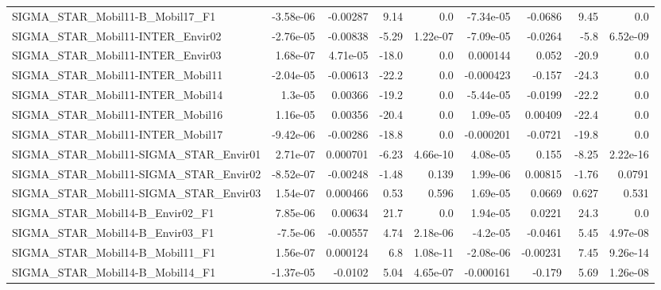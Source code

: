 \begin{tabular}{lrrrrrrrr}
SIGMA\_STAR\_Mobil11-B\_Mobil17\_F1           &   -3.58e-06 &     -0.00287 &    9.14 &      0.0 &  -7.34e-05 &     -0.0686 &         9.45 &           0.0 \\
SIGMA\_STAR\_Mobil11-INTER\_Envir02          &   -2.76e-05 &     -0.00838 &   -5.29 & 1.22e-07 &  -7.09e-05 &     -0.0264 &         -5.8 &      6.52e-09 \\
SIGMA\_STAR\_Mobil11-INTER\_Envir03          &    1.68e-07 &     4.71e-05 &   -18.0 &      0.0 &   0.000144 &       0.052 &        -20.9 &           0.0 \\
SIGMA\_STAR\_Mobil11-INTER\_Mobil11          &   -2.04e-05 &     -0.00613 &   -22.2 &      0.0 &  -0.000423 &      -0.157 &        -24.3 &           0.0 \\
SIGMA\_STAR\_Mobil11-INTER\_Mobil14          &     1.3e-05 &      0.00366 &   -19.2 &      0.0 &  -5.44e-05 &     -0.0199 &        -22.2 &           0.0 \\
SIGMA\_STAR\_Mobil11-INTER\_Mobil16          &    1.16e-05 &      0.00356 &   -20.4 &      0.0 &   1.09e-05 &     0.00409 &        -22.4 &           0.0 \\
SIGMA\_STAR\_Mobil11-INTER\_Mobil17          &   -9.42e-06 &     -0.00286 &   -18.8 &      0.0 &  -0.000201 &     -0.0721 &        -19.8 &           0.0 \\
SIGMA\_STAR\_Mobil11-SIGMA\_STAR\_Envir01     &    2.71e-07 &     0.000701 &   -6.23 & 4.66e-10 &   4.08e-05 &       0.155 &        -8.25 &      2.22e-16 \\
SIGMA\_STAR\_Mobil11-SIGMA\_STAR\_Envir02     &   -8.52e-07 &     -0.00248 &   -1.48 &    0.139 &   1.99e-06 &     0.00815 &        -1.76 &        0.0791 \\
SIGMA\_STAR\_Mobil11-SIGMA\_STAR\_Envir03     &    1.54e-07 &     0.000466 &    0.53 &    0.596 &   1.69e-05 &      0.0669 &        0.627 &         0.531 \\
SIGMA\_STAR\_Mobil14-B\_Envir02\_F1           &    7.85e-06 &      0.00634 &    21.7 &      0.0 &   1.94e-05 &      0.0221 &         24.3 &           0.0 \\
SIGMA\_STAR\_Mobil14-B\_Envir03\_F1           &    -7.5e-06 &     -0.00557 &    4.74 & 2.18e-06 &   -4.2e-05 &     -0.0461 &         5.45 &      4.97e-08 \\
SIGMA\_STAR\_Mobil14-B\_Mobil11\_F1           &    1.56e-07 &     0.000124 &     6.8 & 1.08e-11 &  -2.08e-06 &    -0.00231 &         7.45 &      9.26e-14 \\
SIGMA\_STAR\_Mobil14-B\_Mobil14\_F1           &   -1.37e-05 &      -0.0102 &    5.04 & 4.65e-07 &  -0.000161 &      -0.179 &         5.69 &      1.26e-08 \\

\end{tabular}
